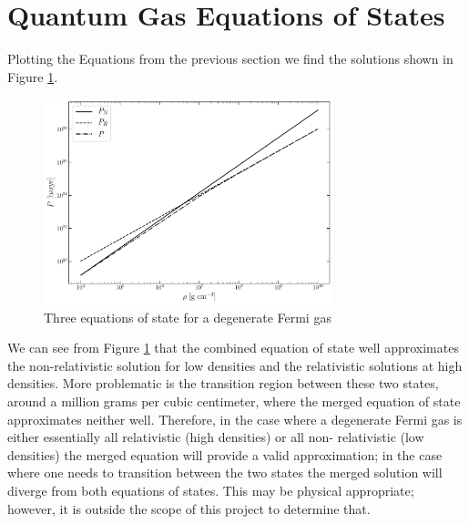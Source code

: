 \section{Quantum Gas Equations of States}
Plotting the Equations from the previous section we find the solutions shown in Figure \ref{fig:degFG}.
\begin{figure}
    \centering
    \includegraphics[width=0.75\textwidth]{Graphics/FermiEOS.pdf}
    \caption{Three equations of state for a degenerate Fermi gas}
    \label{fig:degFG}
\end{figure}
We can see from Figure \ref{fig:degFG} that the combined equation of state well approximates the non-relativistic solution for low densities and the relativistic solutions at high densities. More problematic is the transition region between these two states, around a million grams per cubic centimeter, where the merged equation of state approximates neither well. Therefore, in the case where a degenerate Fermi gas is either essentially all relativistic (high densities) or all non- relativistic (low densities) the merged equation will provide a valid approximation; in the case where one needs to transition between the two states the merged solution will diverge from both equations of states. This may be physical appropriate; however, it is outside the scope of this project to determine that.

